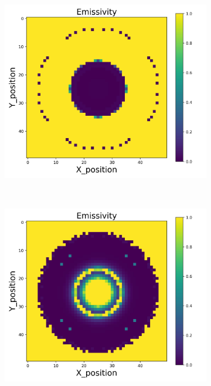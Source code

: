 \begin{figure}[p]
\begin{minipage}{\textwidth}
\begin{subfigure}{0.325\textwidth}
        \end{subfigure}
        \begin{subfigure}{0.325\textwidth}
            \centering
            \includegraphics[width=\textwidth]{figures/raw_data/31/exp/emi_cal.jpg}
        \end{subfigure}
    \end{minipage}\\
    \begin{minipage}{\textwidth}
        \centering
        \begin{subfigure}{0.325\textwidth}
            \centering
            \includegraphics[width=\textwidth]{figures/raw_data/32/exp/emi_cal.jpg}

\end{subfigure}
\end{minipage}
\end{figure}
